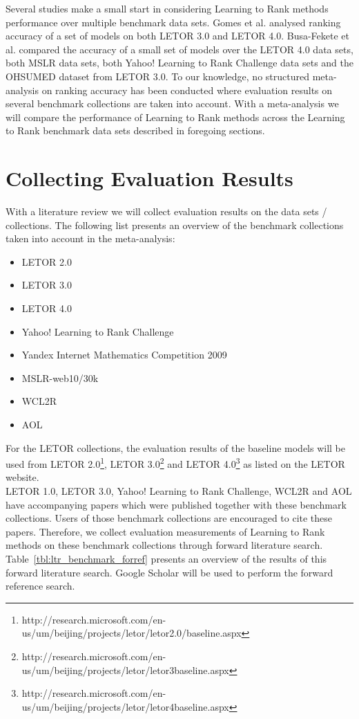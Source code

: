 Several studies make a small start in considering Learning to Rank methods performance over multiple benchmark data sets. Gomes et al. \cite{Gomes2013} analysed ranking accuracy of a set of models on both LETOR 3.0 and LETOR 4.0. Busa-Fekete et al. \cite{Busa-Fekete2013} compared the accuracy of a small set of models over the LETOR 4.0 data sets, both MSLR data sets, both Yahoo! Learning to Rank Challenge data sets and the OHSUMED dataset from LETOR 3.0. To our knowledge, no structured meta-analysis on ranking accuracy has been conducted where evaluation results on several benchmark collections are taken into account. With a meta-analysis we will compare the performance of Learning to Rank methods across the Learning to Rank benchmark data sets described in foregoing sections.

\section{Collecting Evaluation Results}
\label{sec:collecting_evaluation_results}
With a literature review we will collect evaluation results on the data sets / collections. The following list presents an overview of the benchmark collections taken into account in the meta-analysis:
\begin{itemize}
\item LETOR 2.0
\item LETOR 3.0
\item LETOR 4.0
\item Yahoo! Learning to Rank Challenge
\item Yandex Internet Mathematics Competition 2009
\item MSLR-web10/30k
\item WCL2R
\item AOL
\end{itemize}

For the LETOR collections, the evaluation results of the baseline models will be used from LETOR 2.0\footnote{http://research.microsoft.com/en-us/um/beijing/projects/letor/letor2.0/baseline.aspx}, LETOR 3.0\footnote{http://research.microsoft.com/en-us/um/beijing/projects/letor/letor3baseline.aspx} and LETOR 4.0\footnote{http://research.microsoft.com/en-us/um/beijing/projects/letor/letor4baseline.aspx} as listed on the LETOR website.\\

LETOR 1.0, LETOR 3.0, Yahoo! Learning to Rank Challenge, WCL2R and AOL have accompanying papers which were published together with these benchmark collections. Users of those benchmark collections are encouraged to cite these papers. Therefore, we collect evaluation measurements of Learning to Rank methods on these benchmark collections through forward literature search. Table~\ref{tbl:ltr_benchmark_forref} presents an overview of the results of this forward literature search. Google Scholar will be used to perform the forward reference search.

